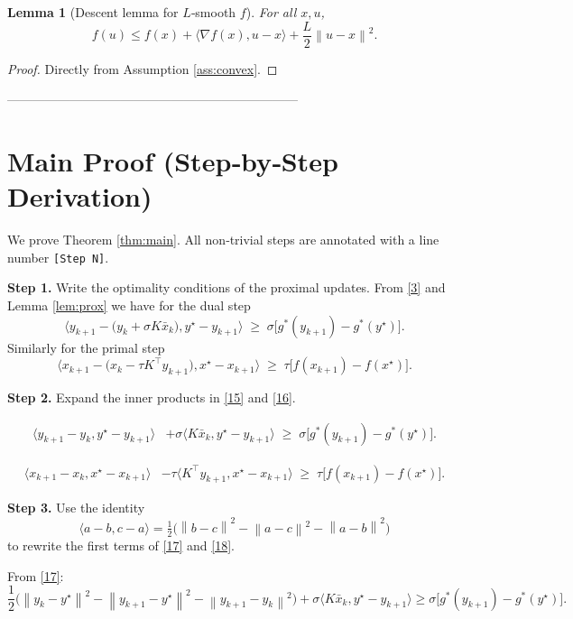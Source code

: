 \documentclass{article}
\newtheorem{lemma}{Lemma}
\newcommand{\inner}[2]{\langle #1,#2\rangle}
\newcommand{\norm}[1]{\left\|#1\right\|}
\begin{document}
\begin{lemma}[Descent lemma for $L$‑smooth $f$]\label{lem:descent}
For all $x,u$,
\[
f(u)\le f(x)+\inner{\nabla f(x)}{u-x}+ \frac{L}{2}\norm{u-x}^{2}.
\tag{14}
\]
\end{lemma}
\begin{proof}
Directly from Assumption \ref{ass:convex}.
\end{proof}

---------------------------------------------------------------------

\section*{Main Proof (Step‑by‑Step Derivation)}

We prove Theorem \ref{thm:main}.  
All non‑trivial steps are annotated with a line number \texttt{[Step N]}.

\medskip

\noindent\textbf{Step 1.}  Write the optimality conditions of the proximal updates.
From \eqref{3} and Lemma \ref{lem:prox} we have for the dual step
\[
\inner{y_{k+1}-\bigl(y_{k}+\sigma K\bar{x}_{k}\bigr)}{y^{\star}-y_{k+1}}
\;\ge\;
\sigma\bigl[g^{*}(y_{k+1})-g^{*}(y^{\star})\bigr].
\tag{15}
\]
Similarly for the primal step
\[
\inner{x_{k+1}-\bigl(x_{k}-\tau K^{\top}y_{k+1}\bigr)}{x^{\star}-x_{k+1}}
\;\ge\;
\tau\bigl[f(x_{k+1})-f(x^{\star})\bigr].
\tag{16}
\]

\medskip

\noindent\textbf{Step 2.}  Expand the inner products in \eqref{15} and \eqref{16}.

\[
\begin{aligned}
\inner{y_{k+1}-y_{k}}{y^{\star}-y_{k+1}} 
&+ \sigma\inner{K\bar{x}_{k}}{y^{\star}-y_{k+1}}
\;\ge\;
\sigma\bigl[g^{*}(y_{k+1})-g^{*}(y^{\star})\bigr] .
\end{aligned}
\tag{17}
\]

\[
\begin{aligned}
\inner{x_{k+1}-x_{k}}{x^{\star}-x_{k+1}}
&- \tau\inner{K^{\top}y_{k+1}}{x^{\star}-x_{k+1}}
\;\ge\;
\tau\bigl[f(x_{k+1})-f(x^{\star})\bigr] .
\end{aligned}
\tag{18}
\]

\medskip

\noindent\textbf{Step 3.}  Use the identity
\[
\inner{a-b}{c-a}= \tfrac12\bigl(\norm{b-c}^{2}-\norm{a-c}^{2}-\norm{a-b}^{2}\bigr)
\tag{19}
\]
to rewrite the first terms of \eqref{17} and \eqref{18}.

From \eqref{17}:
\[
\frac{1}{2}\bigl(\norm{y_{k}-y^{\star}}^{2}
-\norm{y_{k+1}-y^{\star}}^{2}
-\norm{y_{k+1}-y_{k}}^{2}\bigr)
+ \sigma\inner{K\bar{x}_{k}}{y^{\star}-y_{k+1}}
\ge \sigma\bigl[g^{*}(y_{k+1})-g^{*}(y^{\star})\bigr].
\tag{20}
\]
\end{document}
